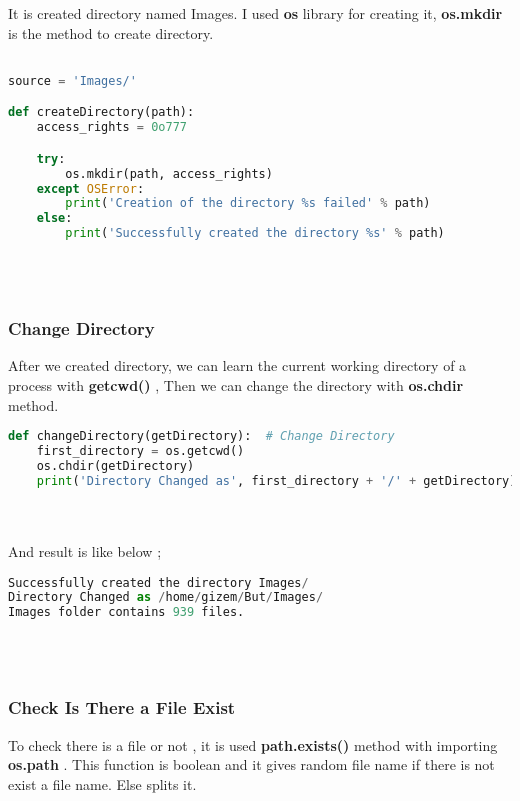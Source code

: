 \documentclass[onecolumn]{article}
\begin{document}
It is created directory named Images. I used \textbf{os} library for creating it,\textbf{ os.mkdir} is the method to create directory.

\begin{lstlisting}[language=Python, caption= Create Directory]

source = 'Images/'

def createDirectory(path): 
    access_rights = 0o777

    try:
        os.mkdir(path, access_rights) 
    except OSError:
        print('Creation of the directory %s failed' % path)
    else:
        print('Successfully created the directory %s' % path)

\end{lstlisting} \\ \\

\subsubsection{Change Directory }

After we created directory, we can learn the  current working directory of a process with \textbf{ getcwd() } , Then we can change the directory with  \textbf{os.chdir} method.

\begin{lstlisting}[language=Python, caption= Change Directory]
def changeDirectory(getDirectory):  # Change Directory 
    first_directory = os.getcwd()
    os.chdir(getDirectory)
    print('Directory Changed as', first_directory + '/' + getDirectory)
\end{lstlisting} \\ \\

And result is like below ; 

\begin{lstlisting}[language=Python, caption= Output]
Successfully created the directory Images/
Directory Changed as /home/gizem/But/Images/
Images folder contains 939 files.
\end{lstlisting} \\ \\


\subsubsection{Check Is There a File Exist}

To check there is a file or not , it is used \textbf{path.exists()} method with importing\textbf{ os.path} . This function is boolean and it gives random file name if there is not exist a file name. Else splits it. 
\end{document}
